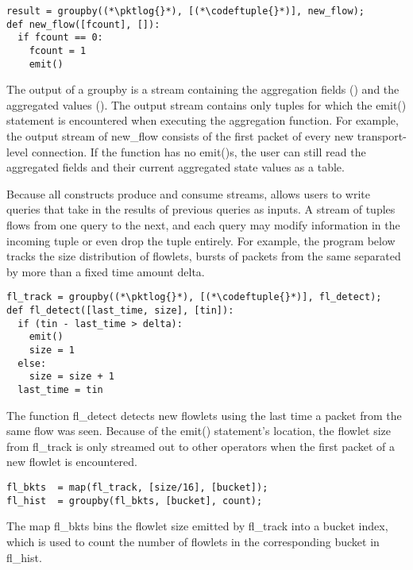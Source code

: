 \begin{lstlisting}
result = groupby((*\pktlog{}*), [(*\codeftuple{}*)], new_flow);
def new_flow([fcount], []):
  if fcount == 0:
    fcount = 1
    emit()
\end{lstlisting}

The output of a {\ct groupby} is a stream containing the aggregation fields
(\eg \txtftuple) and the aggregated values (). The output
stream contains only tuples for which the {\ct emit()} statement is encountered
when executing the aggregation function. For example, the output stream of {\ct
new\_flow} consists of the first packet of every new transport-level
connection. If the function has no {\ct emit()}s, the user can still read the
aggregated fields and their current aggregated state values as a table.

Because all \TheSystem constructs produce and consume streams, \TheSystem
allows users to write queries that take in the results of previous queries as
inputs. A stream of tuples flows from one query to the next, and each query may
modify information in the incoming tuple or even drop the tuple entirely. For
example, the program below tracks the size distribution of flowlets, \ie bursts
of packets from the same \txtftuple separated by more than a fixed time amount
{\ct delta}.

\begin{lstlisting}
fl_track = groupby((*\pktlog{}*), [(*\codeftuple{}*)], fl_detect);
def fl_detect([last_time, size], [tin]):
  if (tin - last_time > delta):
    emit()
    size = 1
  else:
    size = size + 1
  last_time = tin
\end{lstlisting}

The function {\ct fl\_detect} detects new flowlets using the last time a packet
from the same flow was seen. Because of the {\ct emit()} statement's location,
the flowlet size from {\ct fl\_track} is only streamed out to other operators
when the first packet of a new flowlet is encountered.

\begin{lstlisting}
fl_bkts  = map(fl_track, [size/16], [bucket]);
fl_hist  = groupby(fl_bkts, [bucket], count);
\end{lstlisting}

The map {\ct fl\_bkts} bins the flowlet size emitted by {\ct fl\_track} into a
bucket index, which is used to count the number of flowlets in the
corresponding bucket in {\ct fl\_hist}.

